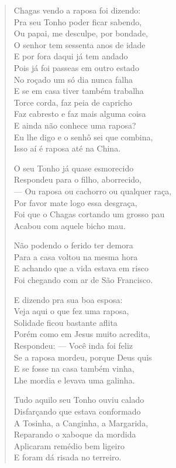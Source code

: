 \begin{verse}
Chagas vendo a raposa foi dizendo:\\
Pra seu Tonho poder ficar sabendo,\\
Ou papai, me desculpe, por bondade,\\
O senhor tem sessenta anos de idade\\
E por fora daqui já tem andado\\
Pois já foi passeas em outro estado\\
No roçado um só dia nunca falha\\
E se em casa tiver também trabalha\\
Torce corda, faz peia de capricho\\
Faz cabresto e faz mais alguma coisa\\
E ainda não conhece uma raposa?\\
Eu lhe digo e o senhô sei que combina,\\
Isso aí é raposa até na China.

O seu Tonho já quase esmorecido\\
Respondeu para o filho, aborrecido,\\
--- Ou raposa ou cachorro ou qualquer raça,\\
Por favor mate logo essa desgraça,\\
Foi que o Chagas cortando um grosso pau\\
Acabou com aquele bicho mau.

Não podendo o ferido ter demora\\
Para a casa voltou na mesma hora\\
E achando que a vida estava em risco\\
Foi chegando com ar de São Francisco.

E dizendo pra sua boa esposa:\\
Veja aqui o que fez uma raposa,\\
Solidade ficou bastante aflita\\
Porém como em Jesus muito acredita,\\
Respondeu: --- Você inda foi feliz\\
Se a raposa mordeu, porque Deus quis\\
E se fosse na casa também vinha,\\
Lhe mordia e levava uma galinha.

Tudo aquilo seu Tonho ouviu calado\\
Disfarçando que estava conformado\\
A Tosinha, a Canginha, a Margarida,\\
Reparando o xaboque da mordida\\
Aplicaram remédio bem ligeiro\\
E foram dá risada no terreiro.


\end{verse}
